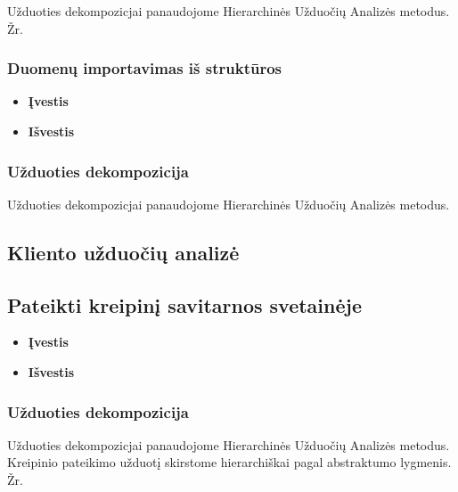 	Užduoties dekompozicjai panaudojome Hierarchinės Užduočių Analizės metodus.
	Žr. 
	\subsubsection{Duomenų importavimas iš struktūros}

		\begin{itemize}
			\item \textbf{Įvestis}
			\item \textbf{Išvestis} 
		\end{itemize}
		
	\subsubsection{Užduoties dekompozicija}

	Užduoties dekompozicjai panaudojome Hierarchinės Užduočių Analizės metodus.
\subsection{Kliento užduočių analizė}

	\subsection{Pateikti kreipinį savitarnos svetainėje}
		
		\begin{itemize}
			\item \textbf{Įvestis}
			\item \textbf{Išvestis} 
		\end{itemize}

	\subsubsection{Užduoties dekompozicija}

	Užduoties dekompozicjai panaudojome Hierarchinės Užduočių Analizės metodus.
	Kreipinio pateikimo užduotį skirstome hierarchiškai pagal abstraktumo lygmenis. Žr. 

	
